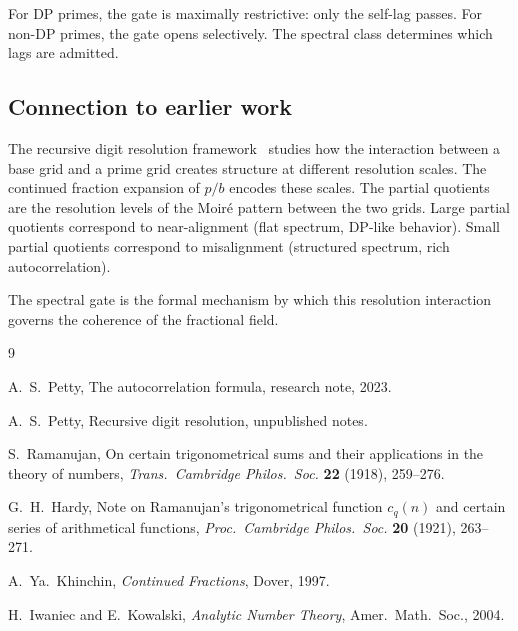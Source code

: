 \documentclass[12pt]{amsart}
\theoremstyle{definition}
\theoremstyle{remark}
\begin{document}
For DP primes, the gate is maximally restrictive: only the self-lag
passes. For non-DP primes, the gate opens selectively. The spectral
class determines which lags are admitted.

\subsection*{Connection to earlier work}

The recursive digit resolution framework~\cite{rdr} studies how
the interaction between a base grid and a prime grid creates
structure at different resolution scales. The continued fraction
expansion of $p/b$ encodes these scales. The partial quotients are
the resolution levels of the Moir\'{e} pattern between the two
grids. Large partial quotients correspond to near-alignment (flat
spectrum, DP-like behavior). Small partial quotients correspond to
misalignment (structured spectrum, rich autocorrelation).

The spectral gate is the formal mechanism by which this resolution
interaction governs the coherence of the fractional field.

\begin{thebibliography}{9}

A.~S.~Petty,
The autocorrelation formula,
research note, 2023.

A.~S.~Petty,
Recursive digit resolution,
unpublished notes.

S.~Ramanujan,
On certain trigonometrical sums and their applications in the
theory of numbers,
\emph{Trans.\ Cambridge Philos.\ Soc.} \textbf{22} (1918), 259--276.

G.~H.~Hardy,
Note on Ramanujan's trigonometrical function $c_q(n)$ and certain
series of arithmetical functions,
\emph{Proc.\ Cambridge Philos.\ Soc.} \textbf{20} (1921), 263--271.

A.~Ya.~Khinchin,
\emph{Continued Fractions},
Dover, 1997.

H.~Iwaniec and E.~Kowalski,
\emph{Analytic Number Theory},
Amer.\ Math.\ Soc., 2004.

\end{thebibliography}
\end{document}
